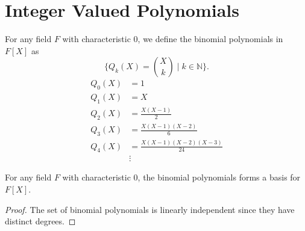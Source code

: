 \section{Integer Valued Polynomials}
\label{sec:integer_valued_polynomial}

\begin{definition}
    \label{def:binomial_polynomial}
    \leanok
    For any field $F$ with characteristic $0$, we define the binomial polynomials in $F[X]$ as
    \[
      \{ Q_k(X) = {X \choose k} \mid k \in \mathbb{N} \}.
    \]
    \begin{equation}
        \begin{aligned}
            Q_0(X) &= 1 \\
            Q_1(X) &= X \\
            Q_2(X) &= \frac{X(X-1)}{2} \\
            Q_3(X) &= \frac{X(X-1)(X-2)}{6} \\
            Q_4(X) &= \frac{X(X-1)(X-2)(X-3)}{24} \\
            &\vdots
        \end{aligned}
    \end{equation}
\end{definition}

\begin{lemma}
    For any field $F$ with characteristic $0$, the binomial polynomials forms a basis for $F[X]$.
    \leanok
\end{lemma}
\begin{proof}
    The set of binomial polynomials is linearly independent since they have distinct degrees.
\end{proof}


